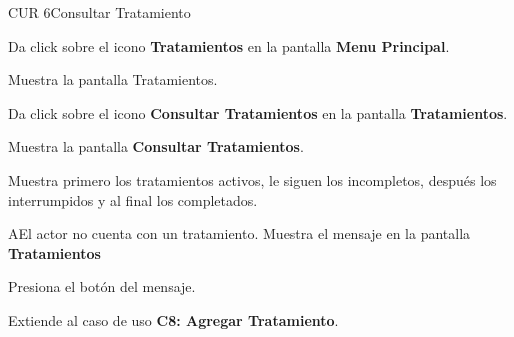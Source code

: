 \begin{UseCase}{CUR 6}{Consultar Tratamiento}
{\begin{UClist}
		\end{UClist}		
	}

 \end{UseCase}

 \begin{UCtrayectoria}
 	
 	\UCpaso [\UCactor] Da click sobre el icono \textbf{Tratamientos} en la pantalla \textbf{Menu Principal}.
 	
 	\UCpaso Muestra la pantalla Tratamientos. \label{cup6:tratamientos}
 	
 	\UCpaso [\UCactor] Da click sobre el icono \textbf{Consultar Tratamientos} en la pantalla \textbf{Tratamientos}.
 	
 	\UCpaso Muestra la pantalla \textbf{Consultar Tratamientos}.
 	
 	\UCpaso Muestra primero los tratamientos activos, le siguen los incompletos, después los interrumpidos y al final los completados.
 	
    
 \end{UCtrayectoria}

 \begin{UCtrayectoriaA}{A}{El actor no cuenta con un tratamiento.}
 	\UCpaso Muestra el mensaje  en la pantalla \textbf{Tratamientos}
 	
 	\UCpaso [\UCactor] Presiona el botón  del mensaje. 

   	\UCpaso Extiende al caso de uso \textbf{C8: Agregar Tratamiento}.
 \end{UCtrayectoriaA}
 
